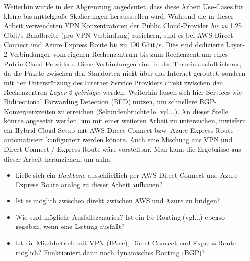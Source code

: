 Weiterhin wurde in der Abgrenzung angedeutet, dass diese Arbeit Use-Cases für kleine bis mittelgroße Skalierungen herausstellen wird. Während die in dieser Arbeit verwendeten VPN Konzentratoren der Public Cloud-Provider \textit{bis zu} 1,25 Gbit/s Bandbreite (pro VPN-Verbindung) zusichern, sind es bei AWS Direct Connect und Azure Express Route bis zu 100 Gbit/s. Dies sind dedizierte Layer-2-Verbindungen vom eigenen Rechenzentrum bis zum Rechenzentrum eines Public Cloud-Providers. Diese Verbindungen sind in der Theorie ausfallsicherer, da die Pakete zwischen den Standorten nicht über das Internet geroutet, sondern mit der Unterstützung des Internet Service Providers direkt zwischen den Rechenzentren \textit{Layer-2 gebridget} werden. Weiterhin lassen sich hier Services wie Bidirectional Forwarding Detection (BFD) nutzen, um schnellere BGP-Konvergenzzeiten zu erreichen (Sekundenbruchteile, vgl...).
An dieser Stelle könnte angesetzt werden, um mit einer weiteren Arbeit zu untersuchen, inwiefern ein Hybrid Cloud-Setup mit AWS Direct Connect bzw. Azure Express Route automatisiert konfiguriert werden könnte. Auch eine Mischung aus VPN und Direct Connect / Express Route wäre vorstellbar. Man kann die Ergebnisse aus dieser Arbeit heranziehen, um anha
\begin{itemize}
    \item Ließe sich ein \textit{Backbone} ausschließlich per AWS Direct Connect und Azure Express Route analog zu dieser Arbeit aufbauen?
    \item Ist es möglich zwischen direkt zwischen AWS und Azure zu bridgen?
    \item Wie sind mögliche Ausfallszenarien? Ist ein Re-Routing (vgl...) ebenso gegeben, wenn eine Leitung ausfällt?
    \item Ist ein Mischbetrieb mit VPN (IPsec), Direct Connect und Express Route möglich? Funktioniert dann noch dynamisches Routing (BGP)?
\end{itemize}
